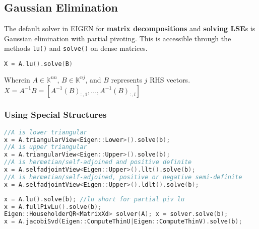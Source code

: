 \documentclass[12pt]{article}
\begin{document}
\subsection{Gaussian Elimination}
The default solver in EIGEN for \textbf{matrix decompositions} and \textbf{solving LSE}s is Gaussian elimination with partial pivoting. This is accessible through the methods \texttt{lu()} and \texttt{solve()} on dense matrices.
\begin{lstlisting}[language=c++]
X = A.lu().solve(B)
\end{lstlisting}
Wherein $A \in \mathbb{K}^{nn}$, $B \in \mathbb{K}^{nj}$, and $B$ represents $j$ RHS vectors.\\
$X = A^{-1}B = \left[ A^{-1}(B)_{:,1}, ..., A^{-1}(B)_{:,l}\right]$
\subsubsection{Using Special Structures}
\begin{lstlisting}[language=c++]
//A is lower triangular
x = A.triangularView<Eigen::Lower>().solve(b);
//A is upper triangular
x = A.triangularView<Eigen::Upper>().solve(b);
//A is hermetian/self-adjoined and positive definite
x = A.selfadjointView<Eigen::Upper>().llt().solve(b);
//A is hermetian/self-adjoined, positive or negative semi-definite
x = A.selfadjointView<Eigen::Upper>().ldlt().solve(b);
\end{lstlisting}

\begin{lstlisting}[language=c++]
x = A.lu().solve(b); //lu short for partial piv lu
x = A.fullPivLu().solve(b);
Eigen::HouseholderQR<MatrixXd> solver(A); x = solver.solve(b);
x = A.jacobiSvd(Eigen::ComputeThinU|Eigen::ComputeThinV).solve(b);
\end{lstlisting}
\end{document}
